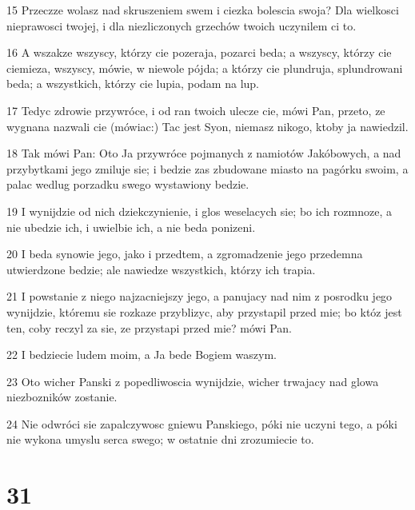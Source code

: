 \par 15 Przeczze wolasz nad skruszeniem swem i ciezka bolescia swoja? Dla wielkosci nieprawosci twojej, i dla niezliczonych grzechów twoich uczynilem ci to.
\par 16 A wszakze wszyscy, którzy cie pozeraja, pozarci beda; a wszyscy, którzy cie ciemieza, wszyscy, mówie, w niewole pójda; a którzy cie plundruja, splundrowani beda; a wszystkich, którzy cie lupia, podam na lup.
\par 17 Tedyc zdrowie przywróce, i od ran twoich ulecze cie, mówi Pan, przeto, ze wygnana nazwali cie (mówiac:) Tac jest Syon, niemasz nikogo, ktoby ja nawiedzil.
\par 18 Tak mówi Pan: Oto Ja przywróce pojmanych z namiotów Jakóbowych, a nad przybytkami jego zmiluje sie; i bedzie zas zbudowane miasto na pagórku swoim, a palac wedlug porzadku swego wystawiony bedzie.
\par 19 I wynijdzie od nich dziekczynienie, i glos weselacych sie; bo ich rozmnoze, a nie ubedzie ich, i uwielbie ich, a nie beda ponizeni.
\par 20 I beda synowie jego, jako i przedtem, a zgromadzenie jego przedemna utwierdzone bedzie; ale nawiedze wszystkich, którzy ich trapia.
\par 21 I powstanie z niego najzacniejszy jego, a panujacy nad nim z posrodku jego wynijdzie, któremu sie rozkaze przyblizyc, aby przystapil przed mie; bo któz jest ten, coby reczyl za sie, ze przystapi przed mie? mówi Pan.
\par 22 I bedziecie ludem moim, a Ja bede Bogiem waszym.
\par 23 Oto wicher Panski z popedliwoscia wynijdzie, wicher trwajacy nad glowa niezbozników zostanie.
\par 24 Nie odwróci sie zapalczywosc gniewu Panskiego, póki nie uczyni tego, a póki nie wykona umyslu serca swego; w ostatnie dni zrozumiecie to.

\chapter{31}

